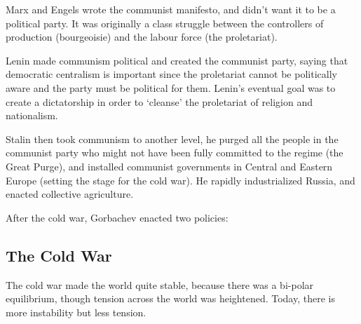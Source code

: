 
Marx and Engels wrote the communist manifesto, and didn't want it to
be a political party. It was originally a class struggle between the
controllers of production (bourgeoisie) and the labour force (the
proletariat).

Lenin made communism political and created the communist party, saying
that democratic centralism is important since the proletariat cannot
be politically aware and the party must be political for them. Lenin's
eventual goal was to create a dictatorship in order to `cleanse' the
proletariat of religion and nationalism.



Stalin then took communism to another level, he purged all the people
in the communist party who might not have been fully committed to the
regime (the Great Purge), and installed communist governments in
Central and Eastern Europe (setting the stage for the cold war). He
rapidly industrialized Russia, and enacted collective agriculture.


After the cold war, Gorbachev enacted two policies:



\subsection{The Cold War}

The cold war made the world quite stable, because there was a bi-polar
equilibrium, though tension across the world was heightened. Today,
there is more instability but less tension.

